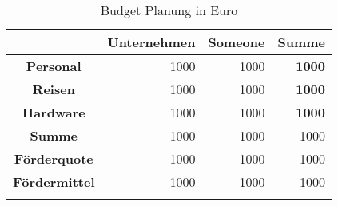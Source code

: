 {%
\providecommand{\dispLhead}{}%
\providecommand{\dispThead}{}%
\providecommand{\dispNfo}{}%
\renewcommand{\dispLhead}[1]{\cellcolor{cell_Head}\color{white}\bfseries#1}%
\renewcommand{\dispThead}[1]{\color{white}\bfseries#1}%
\renewcommand{\dispNfo}[1]{\bfseries#1}%
%
\providecommand{\dispNumCell}{}%
\renewcommand{\dispNumCell}[1]{\num[detect-weight=true,detect-all=true]{#1}}%
\providecommand{\dispSumCell}{}%
\renewcommand{\dispSumCell}[1]{\cellcolor{cell_row1}\bfseries\boldmath#1}%
%
%
%
%
%
%
%
%
%
%
%
\setlength{\tabcolsep}{4pt}%
\renewcommand{\arraystretch}{1.5}%
\renewcommand\theadfont{\bfseries}%
\begin{table}[!htpb]%
\arrayrulewidth=0.8pt%
%
%
\setlength{\extrarowheight}{0ex}%
\centering%
\footnotesize%
\caption{Budget Planung in Euro}%
\edef\columnNumber{4}%
\setTableTextWidth{\tabletextw}{\columnNumber}%
%
%
%
\begin{tabular}{|c|r|r|r|}%
\hline
\rowcolor{cell_Head}
	\multicolumn{1}{|c|}{\dispThead{}}&
	\multicolumn{1}{c|}{\dispThead{Unternehmen}}&
	\multicolumn{1}{c|}{\dispThead{Someone}}&
	\multicolumn{1}{c|}{\dispThead{Summe}}\\
\hline
	\dispLhead{Personal}&
	\dispNumCell{1000}&
	\dispNumCell{1000}&
	\dispSumCell{\dispNumCell{1000}}\\
\hline
	\dispLhead{Reisen}&
	\dispNumCell{1000}&
	\dispNumCell{1000}&
	\dispSumCell{\dispNumCell{1000}}\\
\hline
	\dispLhead{Hardware}&
	\dispNumCell{1000}&
	\dispNumCell{1000}&
	\dispSumCell{\dispNumCell{1000}}\\
\hline
\hline
\rowcolor{cell_row2}
	\dispLhead{Summe}&
	\dispNumCell{1000}&
	\dispNumCell{1000}&
	\dispNumCell{1000}\\
\hline
\hline
\rowcolor{cell_row3}
	\dispLhead{Förderquote}&
	\dispNumCell{1000}&
	\dispNumCell{1000}&
	\dispNumCell{1000}\\
\hline
\rowcolor{cell_row3}
	\dispLhead{Fördermittel}&
	\dispNumCell{1000}&
	\dispNumCell{1000}&
	\dispNumCell{1000}\\
\hline%
\noalign{\vskip\doublerulesep}%
\hline%
\end{tabular}%
\label{tab:budget}%
\end{table}%
\let\dispLhead\undefined
\let\dispThead\undefined
\let\dispNfo\undefined
}%